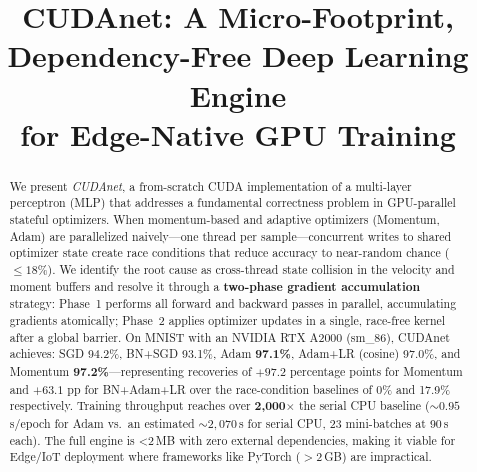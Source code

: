 \documentclass[conference]{IEEEtran}
\begin{document}
\pagestyle{plain}

\title{CUDAnet: A Micro-Footprint, Dependency-Free Deep Learning Engine\\
for Edge-Native GPU Training}

\author{
\and
{}
}

\maketitle

\begin{abstract}
We present \textit{CUDAnet}, a from-scratch CUDA implementation of a multi-layer perceptron (MLP) that addresses a fundamental correctness problem in GPU-parallel stateful optimizers. When momentum-based and adaptive optimizers (Momentum, Adam) are parallelized naively—one thread per sample—concurrent writes to shared optimizer state create race conditions that reduce accuracy to near-random chance ($\leq\!18\%$). We identify the root cause as cross-thread state collision in the velocity and moment buffers and resolve it through a \textbf{two-phase gradient accumulation} strategy: Phase~1 performs all forward and backward passes in parallel, accumulating gradients atomically; Phase~2 applies optimizer updates in a single, race-free kernel after a global barrier. On MNIST with an NVIDIA RTX A2000 (sm\_86), CUDAnet achieves: SGD 94.2\%, BN+SGD 93.1\%, Adam \textbf{97.1\%}, Adam+LR (cosine) 97.0\%, and Momentum \textbf{97.2\%}—representing recoveries of $+97.2$ percentage points for Momentum and $+63.1$ pp for BN+Adam+LR over the race-condition baselines of 0\% and 17.9\% respectively. Training throughput reaches over \textbf{2{,}000$\times$} the serial CPU baseline ($\sim\!0.95$\,s/epoch for Adam vs.\ an estimated $\sim\!2{,}070$\,s for serial CPU, 23 mini-batches at 90\,s each). The full engine is \textless 2\,MB with zero external dependencies, making it viable for Edge/IoT deployment where frameworks like PyTorch ($>2$\,GB) are impractical.
\end{abstract}
\end{document}
